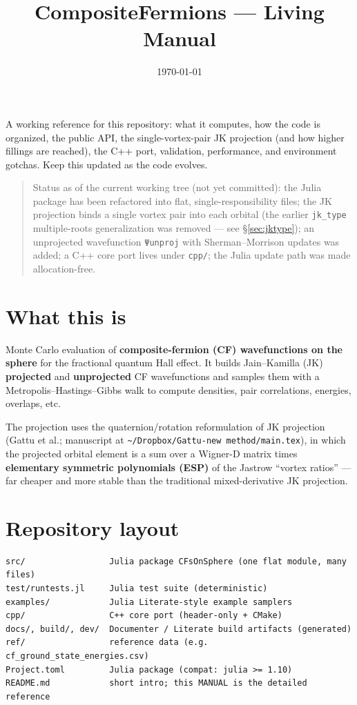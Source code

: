 \documentclass[11pt]{article}
\title{\textbf{CompositeFermions --- Living Manual}}
\author{}
\date{\today}
\newcommand{\code}[1]{\texttt{#1}}
\begin{document}
\maketitle

A working reference for this repository: what it computes, how the code is organized, the
public API, the single-vortex-pair JK projection (and how higher fillings are reached), the
C++ port, validation, performance, and environment gotchas. Keep this updated as the code
evolves.

\begin{quote}\small
Status as of the current working tree (not yet committed): the Julia package has been
refactored into flat, single-responsibility files; the JK projection binds a single vortex
pair into each orbital (the earlier \code{jk\_type} multiple-roots generalization was removed
--- see §\ref{sec:jktype}); an unprojected wavefunction \code{Ψunproj} with Sherman--Morrison
updates was added; a C++ core port lives under \code{cpp/}; the Julia update path was made
allocation-free.
\end{quote}

\tableofcontents

\section{What this is}

Monte Carlo evaluation of \textbf{composite-fermion (CF) wavefunctions on the sphere} for the
fractional quantum Hall effect. It builds Jain--Kamilla (JK) \textbf{projected} and
\textbf{unprojected} CF wavefunctions and samples them with a Metropolis--Hastings--Gibbs walk
to compute densities, pair correlations, energies, overlaps, etc.

The projection uses the quaternion/rotation reformulation of JK projection (Gattu et al.;
manuscript at \code{\textasciitilde/Dropbox/Gattu-new method/main.tex}), in which the projected
orbital element is a sum over a Wigner-D matrix times \textbf{elementary symmetric polynomials
(ESP)} of the Jastrow ``vortex ratios'' --- far cheaper and more stable than the traditional
mixed-derivative JK projection.

\section{Repository layout}

\begin{Verbatim}[fontsize=\small]
src/                 Julia package CFsOnSphere (one flat module, many files)
test/runtests.jl     Julia test suite (deterministic)
examples/            Julia Literate-style example samplers
cpp/                 C++ core port (header-only + CMake)
docs/, build/, dev/  Documenter / Literate build artifacts (generated)
ref/                 reference data (e.g. cf_ground_state_energies.csv)
Project.toml         Julia package (compat: julia >= 1.10)
README.md            short intro; this MANUAL is the detailed reference
\end{Verbatim}
\end{document}
